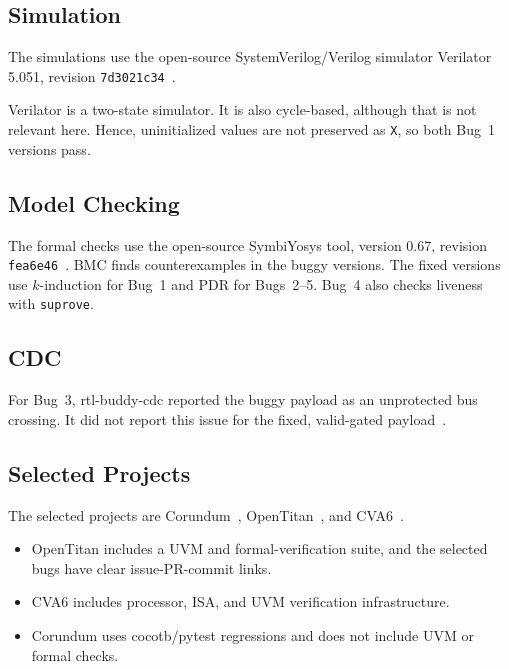 \documentclass[conference]{IEEEtran}
\begin{document}

\subsection{Simulation}

The simulations use the open-source SystemVerilog/Verilog simulator
Verilator 5.051, revision \texttt{7d3021c34}~\cite{verilator-version}.

Verilator is a two-state simulator. It is also cycle-based, although that is
not relevant here. 
Hence, uninitialized values are not preserved as \texttt{X}, so both Bug~1 versions pass.



\subsection{Model Checking}

The formal checks use the open-source SymbiYosys tool, version 0.67,
revision \texttt{fea6e46}~\cite{symbiyosys-version}. BMC finds
counterexamples in the buggy versions. The fixed versions use $k$-induction
for Bug~1 and PDR for Bugs~2--5. Bug~4 also checks liveness with
\texttt{suprove}.

\subsection{CDC}

For Bug~3, rtl-buddy-cdc reported the buggy payload as an unprotected bus
crossing. It did not report this issue for the fixed, valid-gated
payload~\cite{rtl-buddy-cdc,bug3-cdc-results}.


\subsection{Selected Projects}

The selected projects are Corundum~\cite{corundum},
OpenTitan~\cite{opentitan}, and CVA6~\cite{cva6}.

\begin{itemize}[nosep]
\item OpenTitan includes a UVM and formal-verification suite, and the selected bugs have
  clear issue-PR-commit links.
\item CVA6 includes processor, ISA, and UVM verification infrastructure.
\item Corundum uses cocotb/pytest regressions and does not include UVM or
  formal checks.
\end{itemize}
\end{document}
